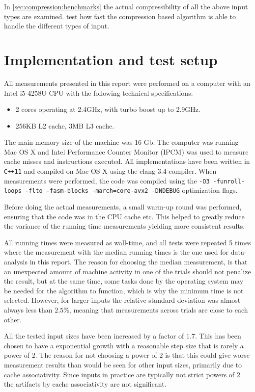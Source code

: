 \documentclass[twoside,11pt,openright]{report}
\begin{document}
In \cref{sec:compression:benchmarks} the actual compressibility of all the above input types are examined.  test how fast the compression based algorithm is able to handle the different types of input.

\section{Implementation and test setup}
All measurements presented in this report were performed on a computer with an Intel i5-4258U CPU with the following technical specifications:
\begin{itemize}
  \item 2 cores operating at 2.4GHz, with turbo boost up to 2.9GHz.
  \item 256KB L2 cache, 3MB L3 cache.
\end{itemize}
The main memory size of the machine was 16 Gb. The computer was running Mac OS X and Intel Performance Counter Monitor (IPCM) was used to measure cache misses and instructions executed. All implementations have been written in \texttt{C++11} and compiled on  Mac OS X using the clang 3.4 compiler. When measurements were performed, the code was compiled using the \texttt{-O3 -funroll-loops -flto -fasm-blocks -march=core-avx2 -DNDEBUG} optimization flags.

Before doing the actual measurements, a small warm-up round was performed, ensuring that the code was in the CPU cache etc. This helped to greatly reduce the variance of the running time measurements yielding more consistent results.

All running times were measured as wall-time, and all tests were repeated 5 times where the measurement with the median running times is the one used for data-analysis in this report. The reason for choosing the median measurement, is that an unexpected amount of machine activity in one of the trials should not penalize the result, but at the same time, some tasks done by the operating system may be needed for the algorithm to function, which is why the minimum time is not selected. However, for larger inputs the relative standard deviation was almost always less than $2.5\%$, meaning that measurements across trials are close to each other.

All the tested input sizes have been increased by a factor of $1.7$. This has been chosen to have a exponential growth with a reasonable step size that is rarely a power of $2$. The reason for not choosing a power of $2$ is that this could give worse measurement results than would be seen for other input sizes, primarily due to cache associativity. Since inputs in practice are typically not strict powers of $2$ the artifacts by cache associativity are not significant.
\end{document}
